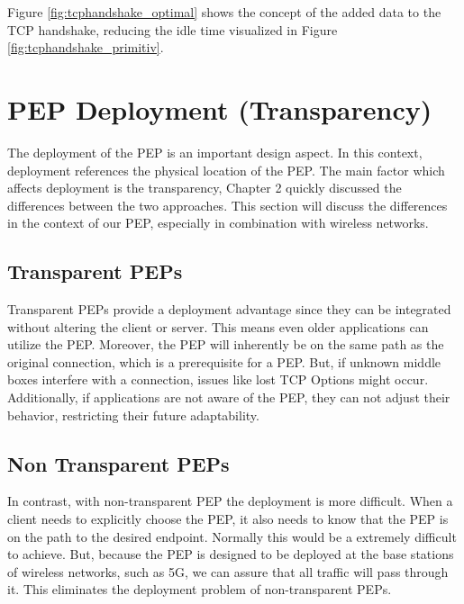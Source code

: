 \documentclass[a4paper,english, 11pt]{report}
\begin{document}
Figure \ref{fig:tcphandshake_optimal} shows the concept of the added data to the TCP handshake, reducing the idle time visualized in Figure \ref{fig:tcphandshake_primitiv}. 


\section{PEP Deployment (Transparency)}
The deployment of the PEP is an important design aspect. In this context, deployment references the physical location of the PEP. The main factor which affects deployment is the transparency, Chapter 2 quickly discussed the differences between the two approaches. This section will discuss the differences in the context of our PEP, especially in combination with wireless networks.

\subsection{Transparent PEPs}
Transparent PEPs provide a deployment advantage since they can be integrated without altering the client or server. This means even older applications can utilize the PEP. Moreover, the PEP will inherently be on the same path as the original connection, which is a prerequisite for a PEP. But, if unknown middle boxes interfere with a connection, issues like lost TCP Options might occur. Additionally, if applications are not aware of the PEP, they can not adjust their behavior, restricting their future adaptability.

\subsection{Non Transparent PEPs}
In contrast, with non-transparent PEP the deployment is more difficult. When a client needs to explicitly choose the PEP, it also needs to know that the PEP is on the path to the desired endpoint.
Normally this would be a extremely difficult to achieve. But, because the PEP is designed to be deployed at the base stations of wireless networks, such as 5G, we can assure that all traffic will pass through it. This eliminates the deployment problem of non-transparent PEPs.\\
\end{document}
